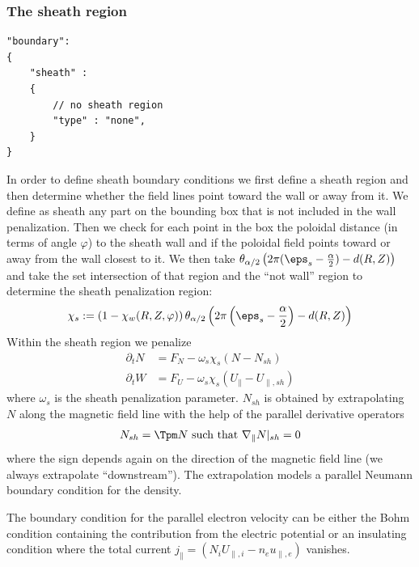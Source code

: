 \subsubsection{The sheath region}\label{sec:sheath}
\begin{verbatim}
"boundary":
{
    "sheath" :
    {
        // no sheath region
        "type" : "none",
    }
}
\end{verbatim}
In order to define sheath boundary conditions we first define a sheath region
and then determine whether the field lines point toward the wall or away from it.
We define as sheath any part on the bounding box that is not included in the wall
penalization. Then we check for each point in the box the poloidal distance (in
terms of angle $\varphi$) to the sheath wall and if the poloidal field points
toward or away from the wall closest to it.
We then take $\theta_{\alpha/2}\left( 2\pi(\eps_s - \frac{\alpha}{2}) - d(R,Z)\right)$
and take the set intersection of that region and the ``not wall'' region to
determine the sheath penalization region:
\begin{align}\label{eq:sheath}
\chi_s := \left(1-\chi_w(R,Z,\varphi)\right) \theta_{\alpha/2}\left( 2\pi\left(\eps_s - \frac{\alpha}{2}\right) - d(R,Z)\right)
\end{align}
Within the sheath region we penalize
\begin{subequations} \label{eq:sheath_penalization}
\begin{align}
    \partial_t N &= F_N -\omega_s \chi_s \left(N-N_{sh}\right)\\
    \partial_t W &= F_U -\omega_s \chi_s \left(U_\parallel-U_{\parallel,sh}\right)
\end{align}
\end{subequations}
where $\omega_s$ is the sheath penalization parameter.
$N_{sh}$ is obtained by extrapolating $N$ along the magnetic field line with
the help of the parallel derivative operators
\begin{align}
    N_{sh} = \Tpm N \text{ such that } \nabla_\parallel N|_{sh} = 0
\end{align}
where the sign depends again on the direction of the magnetic field line (we always extrapolate ``downstream'').
The extrapolation models a parallel Neumann boundary condition for the density.

The boundary condition for the parallel electron velocity can be either the Bohm condition containing the contribution from the electric potential or
an insulating condition where the total current $j_\parallel =  (N_i U_{\parallel,i} - n_e u_{\parallel,e})$ vanishes.

